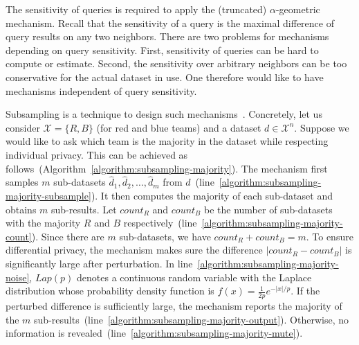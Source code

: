 
The sensitivity of queries is required to apply the (truncated)
$\alpha$-geometric mechanism. Recall that the sensitivity of a query
is the maximal difference of query results on any two neighbors. There are
two problems for mechanisms depending on query sensitivity. First, 
sensitivity of queries can be hard to compute or estimate. Second,
the sensitivity over arbitrary neighbors can be too conservative for
the actual dataset in use. One therefore would like to have
mechanisms independent of query sensitivity.

Subsampling is a technique to design such mechanisms~\cite{DR:14:AFDP}. Concretely, let
us consider $\mathcal{X} = \{ R, B \}$ (for red and blue teams) and a
dataset $d \in \mathcal{X}^n$. Suppose we would like to ask which team
is the majority in the dataset while respecting individual
privacy. This can be achieved as
follows~(Algorithm~\ref{algorithm:subsampling-majority}). The
mechanism first samples $m$ 
sub-datasets $\hat{d}_1, \hat{d}_2, \ldots, \hat{d}_m$ from
$d$~(line~\ref{algorithm:subsampling-majority-subsample}). 
It then computes the majority of each sub-dataset and obtains $m$
sub-results. Let $\mathit{count}_R$ and $\mathit{count}_B$ be the
number of sub-datasets with the majority $R$ and $B$
respectively~(line~\ref{algorithm:subsampling-majority-count}). 
Since there are $m$ sub-datasets, we have
$\mathit{count}_R + \mathit{count}_B = m$. To ensure differential
privacy, the mechanism makes sure the difference $| \mathit{count}_R -
\mathit{count}_B |$ is significantly large after perturbation. In
line~\ref{algorithm:subsampling-majority-noise},
$\mathit{Lap}(p)$ denotes a continuous random
variable with the Laplace distribution whose probability density
function is $f(x) = \frac{1}{2p}e^{-|x|/p}$.
If the perturbed difference is sufficiently large,
the mechanism reports the majority of the $m$
sub-results~(line~\ref{algorithm:subsampling-majority-output}). Otherwise,
no information is
revealed~(line~\ref{algorithm:subsampling-majority-mute}).

